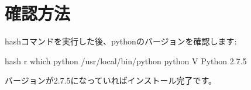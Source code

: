 \documentclass[letterpaper,10pt,dvipdfmx]{sphinxmanual}
\begin{document}
\chapter{確認方法}
\label{\detokenize{verification:id1}}\label{\detokenize{verification::doc}}
hashコマンドを実行した後、pythonのバージョンを確認します:

%
\begin{sphinxVerbatim}[commandchars=\\\{\}]
\PYGZdl{} hash \PYGZhy{}r
\PYGZdl{} which python
/usr/local/bin/python
\PYGZdl{} python \PYGZhy{}V
Python 2.7.5
\end{sphinxVerbatim}

バージョンが2.7.5になっていればインストール完了です。



\renewcommand{\indexname}{索引}
\printindex
\end{document}
